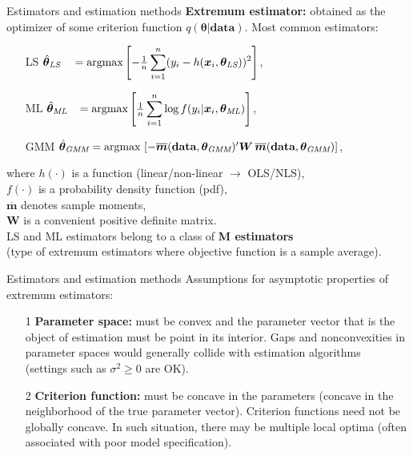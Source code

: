 \documentclass{beamer}
\begin{document}
\begin{frame}{Estimators and estimation methods}
\textbf{Extremum estimator:} obtained as the optimizer of some criterion function $q(\bm{\theta}|\textbf{data})$. Most common estimators:
\medskip
\begin{itemize}
    \item[LS] $\hat{\bm{\theta}}_{\textit{LS}}~~~=\textnormal{argmax}\left[ -\frac{1}{n} \displaystyle\sum_{i=1}^n (y_i - h(\bm{x}_i,\bm{\theta}_{\textit{LS}}))^2\right]$,
    \item[ML] $\hat{\bm{\theta}}_{\textit{ML}}~~\,=\textnormal{argmax}\left[ \frac{1}{n} \displaystyle\sum_{i=1}^n \log f(y_i|\bm{x}_i,\bm{\theta}_{\textit{ML}})\right]$,
    \item[GMM] $\hat{\bm{\theta}}_{\textit{GMM}}=\textnormal{argmax}\,\left[ -\overline{\bm{m}}(\textbf{data},\bm{\theta}_{\textit{GMM}})^{\prime}\bm{W} \, \overline{\bm{m}} (\textbf{data},\bm{\theta}_{\textit{GMM}})\right]$,
\end{itemize}
\medskip
where $h(\cdot)$ is a function (linear/non-linear $\rightarrow$ OLS/NLS),\\ $f(\cdot)$ is a probability density function (pdf),\\$\overline{\bm{m}}$ denotes sample moments, \\$\bm{W}$ is a convenient positive definite matrix.\\
\medskip
LS and ML estimators belong to a class of \textbf{M estimators} \\ \footnotesize (type of extremum estimators where objective function is a sample average).
\end{frame}
\begin{frame}{Estimators and estimation methods}
Assumptions for asymptotic properties of extremum estimators:
\medskip
\begin{itemize}
    \item[1] \textbf{Parameter space:} must be convex and the parameter vector that is the object of estimation must be point in its interior. Gaps and nonconvexities in parameter spaces would generally collide with estimation algorithms \\(settings such as $\sigma^2 \geq 0$ are OK).
    \medskip
    \item[2] \textbf{Criterion function:} must be concave in the parameters (concave in the neighborhood of the true parameter vector). Criterion functions need not be globally concave. In such situation, there may be multiple local optima (often associated with poor model specification).
\end{itemize}
\end{frame}
\end{document}

